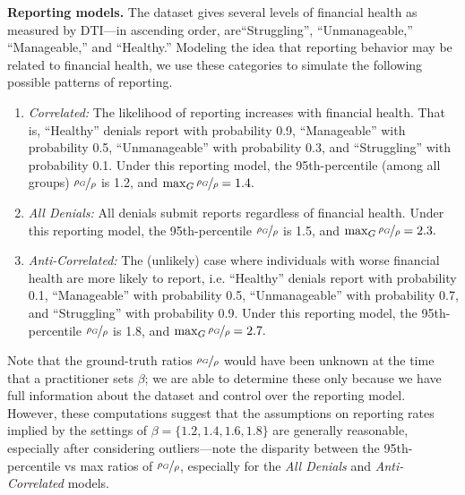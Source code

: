 {\textbf{Reporting models.}
The dataset gives several levels of financial health as measured by DTI---in ascending order, are``Struggling'', ``Unmanageable,'' ``Manageable,'' and ``Healthy.'' 
Modeling the idea that reporting behavior may be related to financial health, we use these categories to simulate the following possible patterns of reporting.
\begin{enumerate}[(1)]
    \item \textit{Correlated:} The likelihood of reporting increases with financial health. That is, ``Healthy'' denials report with probability 0.9, ``Manageable'' with probability 0.5, ``Unmanageable'' with probability 0.3, and ``Struggling'' with probability 0.1. Under this reporting model, the 95th-percentile (among all groups) $\nicefrac{\rho_G}{\rho}$ is 1.2, and $\max_G \nicefrac{\rho_G}{\rho} = 1.4.$
    \item \textit{All Denials:} All denials submit reports regardless of financial health. Under this reporting model, the 95th-percentile $\nicefrac{\rho_G}{\rho}$ is 1.5, and $\max_G \nicefrac{\rho_G}{\rho} = 2.3.$
    \item \textit{Anti-Correlated:} The (unlikely) case where individuals with worse financial health are more likely to report, i.e. ``Healthy'' denials report with probability 0.1, ``Manageable'' with probability 0.5, ``Unmanageable'' with probability 0.7, and ``Struggling'' with probability 0.9. Under this reporting model, the 95th-percentile $\nicefrac{\rho_G}{\rho}$ is 1.8, and $\max_G \nicefrac{\rho_G}{\rho} = 2.7.$
\end{enumerate}
Note that the ground-truth ratios $\nicefrac{\rho_G}{\rho}$ would have been unknown at the time that a practitioner sets $\beta$; we are able to determine these only because we have full information about the dataset and control over the reporting model. However, these computations suggest that the assumptions on reporting rates implied by the settings of $\beta = \{1.2, 1.4, 1.6, 1.8\}$ are generally reasonable, especially after considering outliers---note the disparity between the 95th-percentile vs max ratios of $\nicefrac{\rho_G}{\rho}$, especially for the \textit{All Denials} and \textit{Anti-Correlated} models.

}

